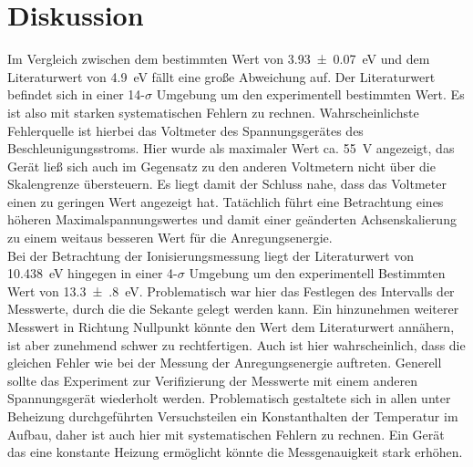 \section{Diskussion}
Im Vergleich zwischen dem bestimmten Wert von \SI{3.93(7)}{\electronvolt} und dem
Literaturwert von \SI{4.9}{\electronvolt}\cite{Anregungsenergie} fällt eine große
Abweichung auf. Der Literaturwert befindet sich in einer 14-$\sigma$ Umgebung
um den experimentell bestimmten Wert. Es ist also mit starken systematischen Fehlern
zu rechnen. Wahrscheinlichste Fehlerquelle ist hierbei das Voltmeter des Spannungsgerätes
des Beschleunigungsstroms. Hier wurde als maximaler Wert ca. \SI{55}{\volt} angezeigt,
das Gerät ließ sich auch im Gegensatz zu den anderen Voltmetern nicht über die Skalengrenze
übersteuern. Es liegt damit der Schluss nahe, dass das Voltmeter einen zu geringen
Wert angezeigt hat. Tatächlich führt eine Betrachtung eines höheren Maximalspannungswertes
und damit einer geänderten Achsenskalierung zu einem weitaus besseren Wert für die
Anregungsenergie.\\
\noindent
Bei der Betrachtung der Ionisierungsmessung liegt der Literaturwert von
\SI{10.438}{\electronvolt} \cite{Ionisierungsenergie}
hingegen in einer 4-$\sigma$ Umgebung um den experimentell Bestimmten Wert von
\SI{13.3(8)}{\electronvolt}.
Problematisch war hier das Festlegen des Intervalls der Messwerte, durch die die Sekante
gelegt werden kann. Ein hinzunehmen weiterer Messwert in Richtung Nullpunkt könnte den
Wert dem Literaturwert annähern, ist aber zunehmend schwer zu rechtfertigen. Auch ist
hier wahrscheinlich, dass die gleichen Fehler wie bei der Messung der Anregungsenergie
auftreten. Generell sollte das Experiment zur Verifizierung der Messwerte mit einem
anderen Spannungsgerät wiederholt werden. Problematisch gestaltete sich in allen
unter Beheizung durchgeführten Versuchsteilen ein Konstanthalten der Temperatur
im Aufbau, daher ist auch hier mit systematischen Fehlern zu rechnen.
Ein Gerät das eine konstante Heizung ermöglicht könnte die Messgenauigkeit stark
erhöhen.
\newpage
\nocite{*}
\printbibliography
